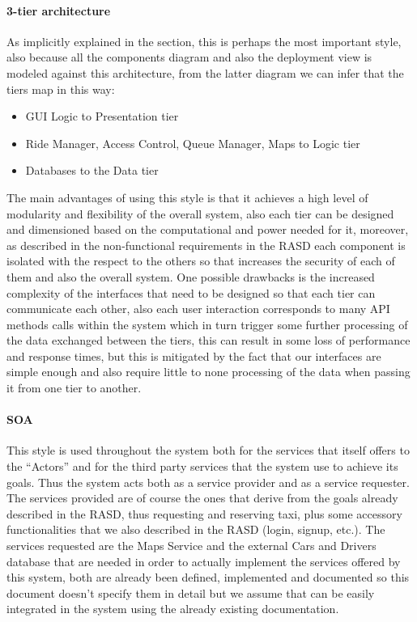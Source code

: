 \paragraph{3-tier architecture}
As implicitly explained in the  section, this is perhaps the most important style, also because all the components diagram and also the deployment view is modeled against this architecture, from the latter diagram we can infer that the tiers map in this way:
\begin{itemize}
	\item GUI Logic to Presentation tier 
	\item Ride Manager, Access Control, Queue Manager, Maps to Logic tier
	\item Databases to the Data tier
\end{itemize}
The main advantages of using this style is that it achieves a high level of modularity and flexibility of the overall system, also each tier can be designed and dimensioned based on the computational and power needed for it, moreover, as described in the non-functional requirements in the RASD each component is isolated with the respect to the others so that increases the security of each of them and also the overall system. One possible drawbacks is the increased complexity of the interfaces that need to be designed so that each tier can communicate each other, also each user interaction corresponds to many API methods calls within the system which in turn trigger some further processing of the data exchanged between the tiers, this can result in some loss of performance and response times, but this is mitigated by the fact that our interfaces are simple enough and also require little to none processing of the data when passing it from one tier to another.
\paragraph{SOA}
This style is used throughout the system both for the services that itself offers to the ``Actors'' and for the third party services that the system use to achieve its goals. Thus the system acts both as a service provider and as a service requester. \newline
The services provided are of course the ones that derive from the goals already described in the RASD, thus requesting and reserving taxi, plus some accessory functionalities that we also described in the RASD (login, signup, etc.).\newline
The services requested are the Maps Service and the external Cars and Drivers database that are needed in order to actually implement the services offered by this system, both are already been defined, implemented and documented so this document doesn't specify them in detail but we assume that can be easily integrated in the system using the already existing documentation. 

